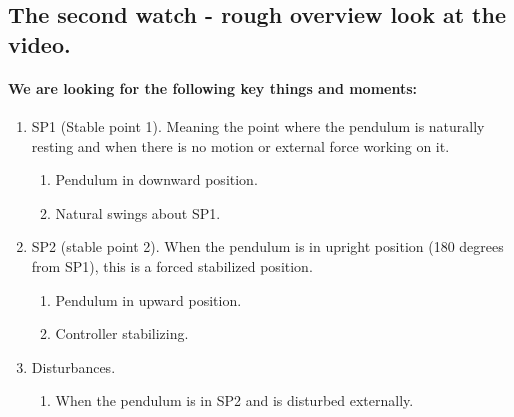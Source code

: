 


\subsection{The second watch - rough overview look at the video.}

\paragraph{We are looking for the following key things and moments:}\begin{enumerate}
    \item  SP1 (Stable point 1). Meaning the point where the pendulum is naturally resting and when there is no motion or external force working on it.
    \begin{enumerate}
        \item Pendulum in downward position.
        \item Natural swings about SP1.
    \end{enumerate}
    \item SP2 (stable point 2). When the pendulum is in upright position (180 degrees from SP1), this is a forced stabilized position.
    \begin{enumerate}
        \item Pendulum in upward position.
        \item Controller stabilizing.
    \end{enumerate}
    \item Disturbances.
    \begin{enumerate}
        \item When the pendulum is in SP2 and is disturbed externally.
    \end{enumerate}
\end{enumerate}


